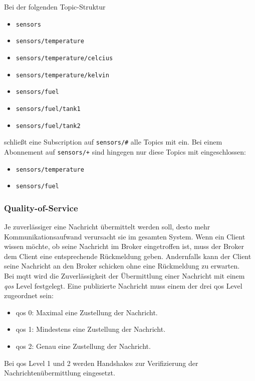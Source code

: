 Bei der folgenden Topic-Struktur
\begin{itemize}
    \item \verb|sensors|
    \item \verb|sensors/temperature|
    \item \verb|sensors/temperature/celcius|
    \item \verb|sensors/temperature/kelvin|
    \item \verb|sensors/fuel|
    \item \verb|sensors/fuel/tank1|
    \item \verb|sensors/fuel/tank2|
\end{itemize}
schlie{\ss}t eine Subscription auf \verb|sensors/#| alle Topics mit ein. Bei einem Abonnement auf \verb|sensors/+| sind hingegen nur diese Topics mit eingeschlossen:
\begin{itemize}
    \item \verb|sensors/temperature|
    \item \verb|sensors/fuel|
\end{itemize}

\subsubsection{Quality-of-Service} \label{s:qos}
Je zuverlässiger eine Nachricht übermittelt werden soll, desto mehr Kommunikationsaufwand verursacht sie im gesamten System.
Wenn ein Client wissen möchte, ob seine Nachricht im Broker eingetroffen ist, muss der Broker dem Client eine entsprechende Rückmeldung geben. Andernfalls kann der Client seine Nachricht an den Broker schicken ohne eine Rückmeldung zu erwarten.
\\
Bei \ac{mqtt} wird die Zuverlässigkeit der Übermittlung einer Nachricht mit einem \textit{\acf{qos}} Level festgelegt. Eine publizierte Nachricht muss einem der drei \ac{qos} Level zugeordnet sein:
\begin{itemize}
    \item \ac{qos} 0: Maximal eine Zustellung der Nachricht.
    \item \ac{qos} 1: Mindestens eine Zustellung der Nachricht.
    \item \ac{qos} 2: Genau eine Zustellung der Nachricht.
\end{itemize}
Bei \ac{qos} Level 1 und 2 werden Handshakes zur Verifizierung der Nachrichtenübermittlung eingesetzt.\cite{mqtt5Specification}

